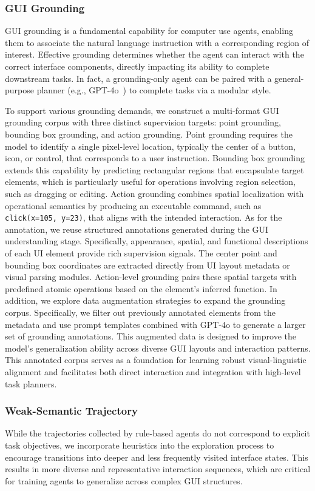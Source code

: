 \subsubsection{GUI Grounding}
\label{sec:gui_grounding}
GUI grounding is a fundamental capability for computer use agents, enabling them to associate the natural language instruction with a corresponding region of interest. Effective grounding determines whether the agent can interact with the correct interface components, directly impacting its ability to complete downstream tasks. In fact, a grounding-only agent can be paired with a general-purpose planner (e.g., GPT-4o~\citep{hurst2024gpt}) to complete tasks via a modular style.

To support various grounding demands, we construct a multi-format GUI grounding corpus with three distinct supervision targets: point grounding, bounding box grounding, and action grounding. Point grounding requires the model to identify a single pixel-level location, typically the center of a button, icon, or control, that corresponds to a user instruction. Bounding box grounding extends this capability by predicting rectangular regions that encapsulate target elements, which is particularly useful for operations involving region selection, such as dragging or editing. Action grounding combines spatial localization with operational semantics by producing an executable command, such as \texttt{click(x=105, y=23)}, that aligns with the intended interaction.
% 
As for the annotation, we reuse structured annotations generated during the GUI understanding stage. Specifically, appearance, spatial, and functional descriptions of each UI element provide rich supervision signals. The center point and bounding box coordinates are extracted directly from UI layout metadata or visual parsing modules. Action-level grounding pairs these spatial targets with predefined atomic operations based on the element’s inferred function. 
% 
In addition, we explore data augmentation strategies to expand the grounding corpus. Specifically, we filter out previously annotated elements from the metadata and use prompt templates combined with GPT-4o to generate a larger set of grounding annotations. This augmented data is designed to improve the model’s generalization ability across diverse GUI layouts and interaction patterns. This annotated corpus serves as a foundation for learning robust visual-linguistic alignment and facilitates both direct interaction and integration with high-level task planners.

\subsubsection{Weak-Semantic Trajectory}
\label{sec:weak_traj}
While the trajectories collected by rule-based agents do not correspond to explicit task objectives, we incorporate heuristics into the exploration process to encourage transitions into deeper and less frequently visited interface states. This results in more diverse and representative interaction sequences, which are critical for training agents to generalize across complex GUI structures.

